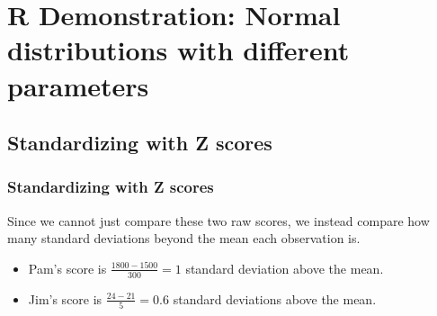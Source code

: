 \documentclass[slidestop,compress,mathserif]{beamer}
\begin{document}


\section{R Demonstration: Normal distributions with different parameters}


\subsection{Standardizing with Z scores}


\begin{frame}
\frametitle{}


\begin{center}
\end{center}

\end{frame}


\begin{frame}
\frametitle{Standardizing with Z scores}

Since we cannot just compare these two raw scores, we instead compare how many standard deviations beyond the mean each observation is.

\begin{itemize}

\item Pam's score is $\frac{1800 - 1500}{300} = 1$ standard deviation above the mean.

\item Jim's score is $\frac{24 - 21}{5} = 0.6$ standard deviations above the mean.

\end{itemize}

\begin{center}
\end{center}

\end{frame}
\end{document}
